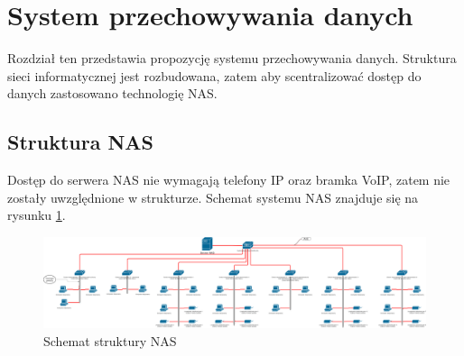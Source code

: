 \section{System przechowywania danych}
Rozdział ten przedstawia propozycję systemu przechowywania danych. Struktura sieci informatycznej jest rozbudowana, zatem aby scentralizować dostęp do danych zastosowano technologię NAS. 

\subsection{Struktura NAS}
Dostęp do serwera NAS nie wymagają telefony IP oraz bramka VoIP, zatem nie zostały uwzględnione w strukturze. Schemat systemu NAS znajduje się na rysunku \ref{schemat:schemat_sieci_NAS}.
\begin{landscape}
	\hspace{4cm}
	\begin{figure}[!h]
		\includegraphics[width=24cm]{Schemat_NAS.png}
		\caption{Schemat struktury NAS}
		\label{schemat:schemat_sieci_NAS}
	\end{figure}
\end{landscape}